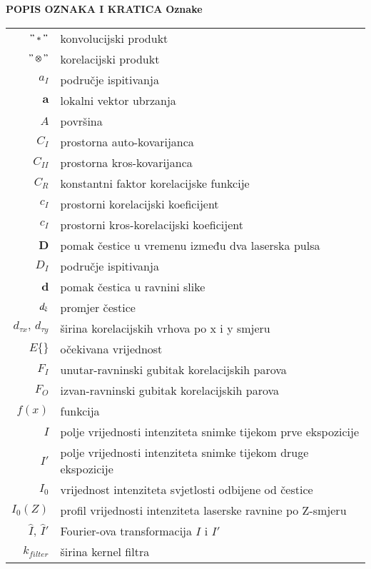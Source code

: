 \begin{flushleft}

{}
{\Large\bf{POPIS OZNAKA I KRATICA}}
\vskip 10mm
{\large\bf{Oznake}}
\vskip 7mm

\begin{longtable}{rl}
		$"\ast"$ & konvolucijski produkt\\
		$"\otimes"$ & korelacijski produkt\\ 
		$a_{I}$ & područje ispitivanja\\
		$\boldsymbol{a}$ & lokalni vektor ubrzanja\\
		$A$ & površina\\
		$C_{I}$ & prostorna auto-kovarijanca\\
		$C_{II}$ & prostorna kros-kovarijanca\\
		$C_{R}$ & konstantni faktor korelacijske funkcije\\
		$c_{I}$ & prostorni korelacijski koeficijent\\
		$c_{I}$ & prostorni kros-korelacijski koeficijent\\
		$\boldsymbol{D}$ & pomak čestice u vremenu između dva laserska pulsa\\
		$D_{I}$ & područje ispitivanja\\
		$\boldsymbol{d}$ & pomak čestica u ravnini slike\\
		$d_{\textup{č}}$ & promjer čestice\\
		$d_{\tau x},\, d_{\tau y}$ & širina korelacijskih vrhova po x i y smjeru\\
		$E\{ \}$ & očekivana vrijednost\\
		$F_{I}$ & unutar-ravninski gubitak korelacijskih parova\\
		$F_{O}$ & izvan-ravninski gubitak korelacijskih parova\\
		$f(x)$ & funkcija\\
		$I$ & polje vrijednosti intenziteta snimke tijekom prve ekspozicije\\
		$I'$ & polje vrijednosti intenziteta snimke tijekom druge ekspozicije\\
		$I_{0}$ & vrijednost intenziteta svjetlosti odbijene od čestice\\
		$I_{0}(Z)$ & profil vrijednosti intenziteta laserske ravnine po Z-smjeru\\
		$\hat{I},\, \hat{I}'$ & Fourier-ova transformacija $I$ i $I'$\\
		$k_{filter}$ & širina kernel filtra\\

\end{longtable}
\end{flushleft}
